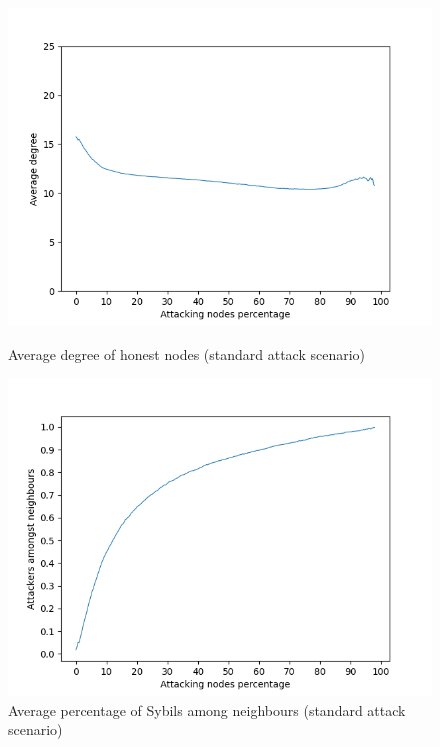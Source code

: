     \begin{figure}[ht]
        \begin{minipage}[b]{0.5\linewidth}
            \includegraphics[width=1.1\textwidth]{pict/results/in-hon-avg-neigh.png}
			\centering
			\caption{Average degree of honest nodes (standard attack scenario)}
			\label{fig:degreehon}
        \end{minipage}
        \hspace{0.5cm}
        \begin{minipage}[b]{0.5\linewidth}
			\includegraphics[width=1.1\textwidth]{pict/results/in-hon-avg-neigh-atk.png}
			\centering
			\caption{Average percentage of Sybils among neighbours (standard attack scenario)}
			\label{fig:avgatk}
        \end{minipage}
    \end{figure}


